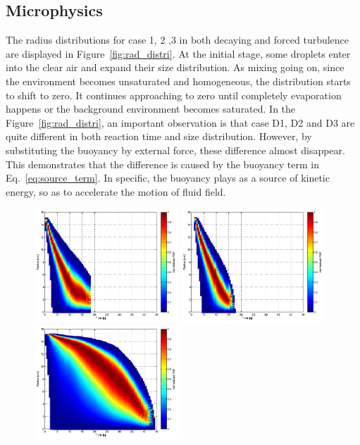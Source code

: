 \documentclass[draft,jgrga]{AGUTeX}
\newcommand{\Eq}[1]{Eq.~\eqref{#1}} \newcommand{\Fig}[1]{Figure~\ref{#1}}
\begin{document}
\begin{article}
\subsection{Microphysics}
The radius distributions for case 1, 2 ,3 in both decaying and forced turbulence are displayed in \Fig{fig:rad_distri}. At the initial stage, some droplets enter into the clear air and expand their size distribution. As mixing going on, since the environment becomes unsaturated and homogeneous, the distribution starts to shift to zero. It continues approaching to zero until completely evaporation happens or the background environment becomes saturated. 
In the \Fig{fig:rad_distri}, an important observation is that case D1, D2 and D3 are quite different in both reaction time and size distribution. However, by substituting the buoyancy by external force, these difference almost disappear. This demonstrates that the difference is caused by the buoyancy term in \Eq{eq:source_term}. In specific, the buoyancy plays as a source of kinetic energy, so as to accelerate the motion of fluid field.
\begin{figure}[H]\centering
\includegraphics[width=0.48\textwidth]{Figures/pdf_radius_d1}
\includegraphics[width=0.48\textwidth]{Figures/pdf_radius_f1}\\
\includegraphics[width=0.48\textwidth]{Figures/pdf_radius_d2}

\end{figure}
\end{article}
\end{document}
